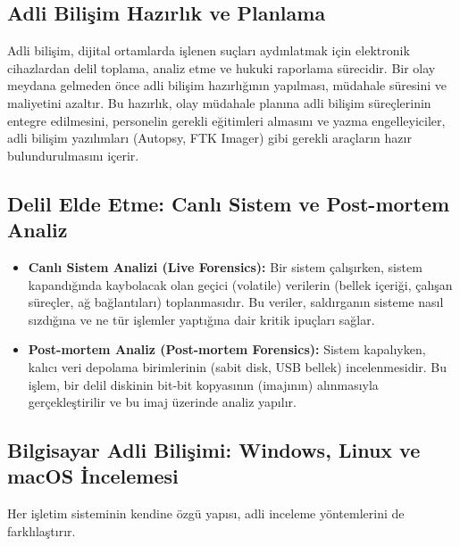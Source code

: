 \subsection{Adli Bilişim Hazırlık ve Planlama}

Adli bilişim, dijital ortamlarda işlenen suçları aydınlatmak için elektronik cihazlardan delil toplama, analiz etme ve hukuki raporlama sürecidir. Bir olay meydana gelmeden önce adli bilişim hazırlığının yapılması, müdahale süresini ve maliyetini azaltır. Bu hazırlık, olay müdahale planına adli bilişim süreçlerinin entegre edilmesini, personelin gerekli eğitimleri almasını ve yazma engelleyiciler, adli bilişim yazılımları (Autopsy, FTK Imager) gibi gerekli araçların hazır bulundurulmasını içerir.

\subsection{Delil Elde Etme: Canlı Sistem ve Post-mortem Analiz}

\begin{itemize}
    \item \textbf{Canlı Sistem Analizi (Live Forensics):} Bir sistem çalışırken, sistem kapandığında kaybolacak olan geçici (volatile) verilerin (bellek içeriği, çalışan süreçler, ağ bağlantıları) toplanmasıdır. Bu veriler, saldırganın sisteme nasıl sızdığına ve ne tür işlemler yaptığına dair kritik ipuçları sağlar.
    \item \textbf{Post-mortem Analiz (Post-mortem Forensics):} Sistem kapalıyken, kalıcı veri depolama birimlerinin (sabit disk, USB bellek) incelenmesidir. Bu işlem, bir delil diskinin bit-bit kopyasının (imajının) alınmasıyla gerçekleştirilir ve bu imaj üzerinde analiz yapılır.
\end{itemize}

\subsection{Bilgisayar Adli Bilişimi: Windows, Linux ve macOS İncelemesi}

Her işletim sisteminin kendine özgü yapısı, adli inceleme yöntemlerini de farklılaştırır.

